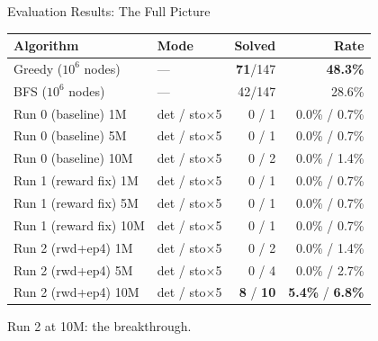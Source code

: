 \documentclass[aspectratio=169,11pt]{beamer}
\begin{document}
\begin{frame}{Evaluation Results: The Full Picture}
  \small
  \begin{center}
  \begin{tabular}{llrr}
    \toprule
    \textbf{Algorithm} & \textbf{Mode} & \textbf{Solved} & \textbf{Rate} \\
    \midrule
    Greedy ($10^6$ nodes) & --- & \textbf{71}/147 & \textcolor{good}{\textbf{48.3\%}} \\
    BFS ($10^6$ nodes)    & --- & 42/147           & 28.6\% \\
    \midrule
    Run 0 (baseline) 1M   & det / sto$\times$5 & 0 / 1  & 0.0\% / 0.7\% \\
    Run 0 (baseline) 5M   & det / sto$\times$5 & 0 / 1  & 0.0\% / 0.7\% \\
    Run 0 (baseline) 10M  & det / sto$\times$5 & 0 / 2  & 0.0\% / 1.4\% \\
    \midrule
    Run 1 (reward fix) 1M  & det / sto$\times$5 & 0 / 1  & 0.0\% / 0.7\% \\
    Run 1 (reward fix) 5M  & det / sto$\times$5 & 0 / 1  & 0.0\% / 0.7\% \\
    Run 1 (reward fix) 10M & det / sto$\times$5 & 0 / 1  & 0.0\% / 0.7\% \\
    \midrule
    Run 2 (rwd+ep4) 1M     & det / sto$\times$5 & 0 / 2  & 0.0\% / 1.4\% \\
    Run 2 (rwd+ep4) 5M     & det / sto$\times$5 & 0 / 4  & 0.0\% / 2.7\% \\
    \rowcolor{highlight}
    Run 2 (rwd+ep4) 10M    & det / sto$\times$5 & \textcolor{good}{\textbf{8}} / \textcolor{good}{\textbf{10}} & \textcolor{good}{\textbf{5.4\%}} / \textcolor{good}{\textbf{6.8\%}} \\
    \bottomrule
  \end{tabular}
  \end{center}

  \medskip
  \begin{center}
    \Large\textcolor{good}{Run 2 at 10M: the breakthrough.}
  \end{center}
\end{frame}
\end{document}

